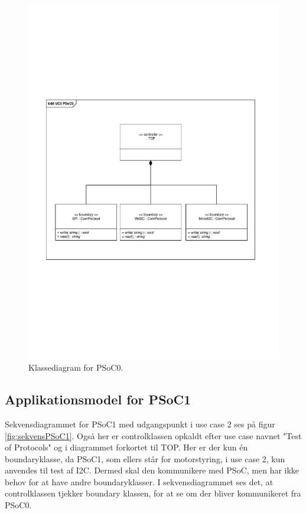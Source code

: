 \begin{figure}[H]
	\centering
	\includegraphics[trim = {1.2cm 8.2cm 1.8cm 7.7cm}, clip = true, width=\textwidth] {Systemarkitektur/images/klassediagramPSoC0.pdf}
	\caption{Klassediagram for PSoC0.}
	\label{fig:klassePSoC0}
\end{figure}

\subsection{Applikationsmodel for PSoC1}
Sekvensdiagrammet for PSoC1 med udgangspunkt i use case 2 ses på figur \ref{fig:sekvensPSoC1}. Også her er controlklassen opkaldt efter use case navnet "Test of Protocols" og i diagrammet forkortet til TOP. Her er der kun én boundaryklasse, da PSoC1, som ellers står for motorstyring, i use case 2, kun anvendes til test af I2C. Dermed skal den kommunikere med PSoC, men har ikke behov for at have andre boundaryklasser. I sekvensdiagrammet ses det, at controlklassen tjekker boundary klassen, for at se om der bliver kommunikeret fra PSoC0. 

